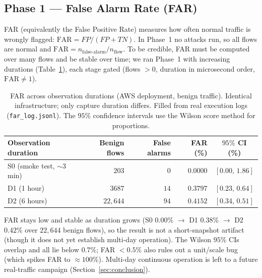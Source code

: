 \documentclass[preprint,12pt,authoryear]{elsarticle}
\begin{document}
\subsection{Phase 1 --- False Alarm Rate (FAR)}
\label{sec:rt-far}
FAR (equivalently the False Positive Rate) measures how often normal traffic is
wrongly flagged: $\mathrm{FAR} = FP/(FP+TN)$. In Phase~1 no attacks run, so all
flows are normal and $\mathrm{FAR} = n_{\text{false-alarm}}/n_{\text{flow}}$. To be
credible, FAR must be computed over many flows and be stable over time; we ran
Phase~1 with increasing durations (Table~\ref{tab:far}), each stage gated
(flows $>0$, duration in microsecond order, $\mathrm{FAR}\neq 1$).

\begin{table}[htbp]
\centering
\caption{FAR across observation durations (AWS deployment, benign traffic).
Identical infrastructure; only capture duration differs. Filled from real
execution logs (\texttt{far\_log.jsonl}). The $95\%$ confidence intervals use the
Wilson score method for proportions.}
\label{tab:far}
\begin{tabular}{lrrrc}
\toprule
Observation duration & Benign flows & False alarms & FAR (\%) & $95\%$ CI (\%) \\
\midrule
S0 (smoke test, $\sim$3 min) & $203$    & $0$  & $0.0000$ & $[0.00,\,1.86]$ \\
D1 (1 hour)                  & $3687$   & $14$ & $0.3797$ & $[0.23,\,0.64]$ \\
D2 (6 hours)                 & $22{,}644$ & $94$ & $0.4152$ & $[0.34,\,0.51]$ \\
\bottomrule
\end{tabular}
\end{table}

\noindent FAR stays low and stable as duration grows (S0 $0.00\%$ $\rightarrow$ D1
$0.38\%$ $\rightarrow$ D2 $0.42\%$ over $22{,}644$ benign flows), so the result is
not a short-snapshot artifact (though it does not yet establish multi-day
operation). The Wilson $95\%$ CIs overlap and all lie below $0.7\%$; FAR $<0.5\%$
also rules out a unit/scale bug (which spikes FAR to $\approx 100\%$). Multi-day
continuous operation is left to a future real-traffic campaign
(Section~\ref{sec:conclusion}).
\end{document}
